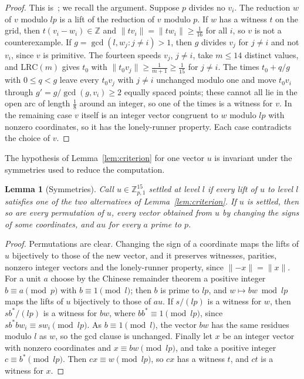 \documentclass[11pt]{amsart}
\newtheorem{lemma}[theorem]{Lemma}
\theoremstyle{definition}
\theoremstyle{remark}
\newcommand{\Z}{\mathbb{Z}}
\newcommand{\LRC}{\mathrm{LRC}}
\begin{document}
\begin{proof}
This is~\cite[Lemma~2.2]{All26}; we recall the argument. Suppose $p$ divides
no $v_i$. The reduction $w$ of $v$ modulo $lp$ is a lift of the reduction of
$v$ modulo $p$. If $w$ has a witness $t$ on the grid, then $t(v_i-w_i)\in\Z$
and $\|tv_i\|=\|tw_i\|\ge\frac1{16}$ for all $i$, so $v$ is not a
counterexample. If $g=\gcd(l,w_j:j\ne i)>1$, then $g$ divides $v_j$ for
$j\ne i$ and not $v_i$, since $v$ is primitive. The fourteen speeds $v_j$,
$j\ne i$, take $m\le 14$ distinct values, and $\LRC(m)$ gives $t_0$ with
$\|t_0v_j\|\ge\frac1{m+1}\ge\frac1{15}$ for $j\ne i$. The times
$t_0+q/g$ with $0\le q<g$ leave every $t_0v_j$ with $j\ne i$ unchanged
modulo one and move $t_0v_i$ through $g'=g/\gcd(g,v_i)\ge2$ equally spaced
points; these cannot all lie in the open arc of length $\frac18$ around an
integer, so one of the times is a witness for $v$. In the remaining case $v$
itself is an integer vector congruent to $w$ modulo $lp$ with nonzero
coordinates, so it has the lonely-runner property. Each case contradicts
the choice of $v$.
\end{proof}

The hypothesis of Lemma~\ref{lem:criterion} for one vector $u$ is invariant
under the symmetries used to reduce the computation.

\begin{lemma}[Symmetries]\label{lem:symm}
Call $u\in\Z_{p,1}^{15}$ \emph{settled at level $l$} if every lift of $u$ to
level $l$ satisfies one of the two alternatives of
Lemma~\ref{lem:criterion}. If $u$ is settled, then so are every permutation
of $u$, every vector obtained from $u$ by changing the signs of some
coordinates, and $au$ for every $a$ prime to $p$.
\end{lemma}

\begin{proof}
Permutations are clear. Changing the sign of a coordinate maps the lifts of
$u$ bijectively to those of the new vector, and it preserves witnesses,
parities, nonzero integer vectors and the lonely-runner property, since
$\|{-x}\|=\|x\|$. For a unit $a$ choose by the Chinese remainder theorem a
positive integer $b\equiv a\pmod p$ with $b\equiv1\pmod l$; then $b$ is
prime to $lp$, and $w\mapsto bw\bmod lp$ maps the lifts of $u$ bijectively
to those of $au$. If $s/(lp)$ is a witness for $w$, then $sb^*/(lp)$ is a
witness for $bw$, where $bb^*\equiv1\pmod{lp}$, since
$sb^*bw_i\equiv sw_i\pmod{lp}$. As $b\equiv1\pmod l$, the vector $bw$ has
the same residues modulo $l$ as $w$, so the gcd clause is unchanged. Finally
let $x$ be an integer vector with nonzero coordinates and $x\equiv bw\pmod
{lp}$, and take a positive integer $c\equiv b^*\pmod{lp}$. Then
$cx\equiv w\pmod{lp}$, so $cx$ has a witness $t$, and $ct$ is a witness for
$x$.
\end{proof}
\end{document}
